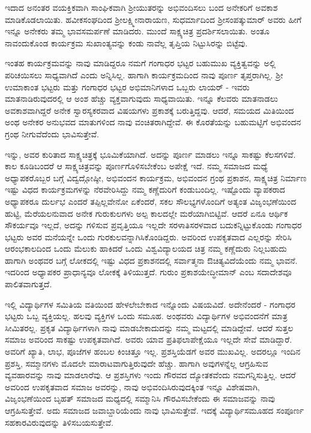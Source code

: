 {ಇದಾದ ಅನಂತರ ವಯಕ್ತಿಕವಾಗಿ ಸಾಂಘಿಕವಾಗಿ ಶ್ರೀಯುತರನ್ನು ಅಭಿವಂದಿಸಲು ಬಂದ ಅನೇಕರಿಗೆ ಅವಕಾಶ ಮಾಡಿಕೊಡಲಾಯಿತು. ಹವೀಕಸಂಘದಿಂದ ಶ್ರೀಲಕ್ಷ್ಮೀ\-ನಾರಾಯಣ, ಸುಧರ್ಮಾದಿಂದ ಶ್ರೀಸಂಪತ್ಕುಮಾರ್ ಅವರು ಹೀಗೆ ಇನ್ನೂ ಅನೇಕರು ತಮ್ಮ ಭಾವಸಮರ್ಪಣೆ ಮಾಡಿದರು. ಮುಂದೆ ಸಾಕ್ಷ್ಯಚಿತ್ರ ಪ್ರದರ್ಶಿಸಲಾಯಿತು. ಅಂತೂ ನಾವಂದುಕೊಂಡ ಕಾರ್ಯಕ್ರಮ ಸುಖಾಂತ್ಯವನ್ನು ಕಂಡು ನಾವೆಲ್ಲ ತೃಪ್ತಿಯ ನಿಟ್ಟುಸಿರನ್ನು ಬಿಟ್ಟೆವು.

ಇಂತಹ ಕಾರ್ಯಕ್ರಮವನ್ನು ನಾವು ಮಾಡಿದ್ದರೂ ನಮಗೆ  ಗಂಗಾಧರ ಭಟ್ಟರ ಬಹುಮುಖ ವ್ಯಕ್ತಿತ್ವವನ್ನು ಅಲ್ಲಿ ಪರಿಚಯಿಸಲು ಸಾಧ್ಯವಾಗಿದೆ ಎಂದು ಅನ್ನಿಸಿಲ್ಲ. ಹಾಗಾಗಿ ಕಾರ್ಯಕ್ರಮದಿಂದ ನಾವು ಪೂರ್ಣ ತೃಪ್ತರಾಗಿಲ್ಲ. ಶ್ರೀ ಉಮಾಕಾಂತ ಭಟ್ಟರು ಮತ್ತು  ಗಂಗಾಧರ ಭಟ್ಟರ ಅಭಿಮಾನಿಗಳಾದ ಒಬ್ಬರು ಲಾಯರ್  - ಇವರು ಮಾತನಾಡಿರುವುದರಲ್ಲಿ ಆ ಅಂಶ ಹೆಚ್ಚು ವ್ಯಕ್ತವಾಗುವುದು ಸಾಧ್ಯವಾಯಿತು. ಇನ್ನೂ ಕೆಲವರು ಮಾತನಾಡಲು ಅವಕಾಶವಾಗಿದ್ದರೆ ಅನೇಕ  ಸ್ವಾರಸ್ಯಕರವಾದ ವಿಷಯಗಳು ಪ್ರಕಾಶಕ್ಕೆ ಬರುತ್ತಿದ್ದವು. ಆದರೆ, ಸಮಯದ ಮಿತಿಯಿಂದ ಅಂಥ ಅನೇಕರ ಅನುಭವದ ಮಾತುಗಳಿಂದ ನಾವು ವಂಚಿತರಾಗಿದ್ದೇವೆ. ಈ ಕೊರತೆಯನ್ನು ಬಹುಮಟ್ಟಿಗೆ ಅಭಿವಂದನ ಗ್ರಂಥ ನೀಗುವೆದೆಂದು ಭಾವಿಸುತ್ತೇವೆ. 

ಇನ್ನು, ಅವರ ಕುರಿತಾದ ಸಾಕ್ಷ್ಯಚಿತ್ರಕ್ಕೆ ಭೂಮಿಕೆಯಾಗಿದೆ. ಅದನ್ನು ಪೂರ್ಣ ಮಾಡಲು ಇನ್ನೂ ಸಾಕಷ್ಟು ಕೆಲಸಗಳಿವೆ.  ಕಾಲ \hbox{ಕೂಡಿಬಂದರೆ} ಆ ಸಾಕ್ಷ್ಯಚಿತ್ರವನ್ನು \hbox{ಪೂರ್ಣಗೊಳಿಸಬೇಕೆಂಬ} ಅಪೇಕ್ಷೆ ಇದೆ.
ನಮ್ಮ ಸಮಾಜದ ಮಧ್ಯೆ  ಅಧ್ಯಾಪಕರೊಬ್ಬರ ಬಗ್ಗೆ  ವಿದ್ವದ್ಗೋಷ್ಠೀ, ಅಭಿವಂದನ ಕಾರ್ಯಕ್ರಮ, ಅಭಿವಂದನ ಗ್ರಂಥ ಪ್ರಕಾಶನ, \hbox{ಸಾಕ್ಷ್ಯಚಿತ್ರ} ನಿರ್ಮಾಣ ಇಷ್ಟು ವಿಧದ ಕಾರ್ಯಕ್ರಮಗಳನ್ನು  ನೆರವೇರಿಸಿದ್ದು ನಮ್ಮ ಕಣ್ಣೆದುರಿಗೆ ಕಂಡುಬಂದಿಲ್ಲ. ಇಷ್ಟೊಂದು ವ್ಯಾಪಕರಾದ \hbox{ಅಧ್ಯಾಪಕರೂ} ದುರ್ಲಭ ಎಂದರೆ ತಪ್ಪಿಲ್ಲವೇನೋ ಏಕೆಂದರೆ, ಸಕಲ \hbox{ಸೌಲಭ್ಯ}ಗಳೊಂದಿಗೆ ಅತ್ಯಂತ ವಿಜೃಂಭಣೆಯಿಂದ \hbox{ಹುಟ್ಟಿ,} ಮೆರೆಯಲನುವಾದ ಅನೇಕ ಗುರುಕುಲಗಳು ಅಲ್ಪ \hbox{ಕಾಲದಲ್ಲೇ} ಮರೆಯಾಗಿಬಿಟ್ಟಿವೆ. ಆದರೆ ಏನೂ ಆರ್ಥಿಕ ಸೌಕರ್ಯವೂ ಇಲ್ಲದೆ, ಅದನ್ನು ಗಳಿಸುವ ಪ್ರವೃತ್ತಿಯೂ ಇಲ್ಲದೇ  ಸರಳಾತಿಸರಳವಾದ ಬದುಕನ್ನಿಟ್ಟುಕೊಂಡು ಗಂಗಾಧರ ಭಟ್ಟರು ಅವರ ಮನೆಯನ್ನೇ ಒಂದು ಗುರಕುಲವನ್ನಾಗಿಸಿಕೊಂಡಿದ್ದರು. ಅವರಿಂದ ಉಪಕೃತವಾದ ಎಲ್ಲರನ್ನು  ಸೇರಿಸಿ ಆರಂಭಕಾಲದಿಂದ ಒಂದು ಮೆಲುಕು ಹಾಕಿದರೆ ಒಂದು ವಿಶ್ವವಿದ್ಯಾಲಯದ  ಚಿತ್ರ ನಮ್ಮ  ಕಣ್ಣೆದುರು ನಿಲ್ಲಬಹುದು ಹಾಗಾಗಿ ಅಂಥವರ ಬಗ್ಗೆ ಲೋಕದಲ್ಲಿ ಇಷ್ಟು ವಿಧದ ಪ್ರಕಾಶನದಲ್ಲಿ ಸರ್ವಾತ್ಮನಾ  ಔಚಿತ್ಯವಿದೆಯೆಂದು ನಮ್ಮ ಭಾವನೆ. ಇದರಿಂದ ಅಧ್ಯಾಪಕರ ಪ್ರಾಧಾನ್ಯವೂ ಲೋಕಕ್ಕೆ ತಿಳಿಯುತ್ತದೆ. ಗುರುಂ ಪ್ರಕಾಶಯೇದ್ಧೀಮಾನ್ ಎಂಬ ಸದಾದೇಶವೂ  \hbox{ಪಾಲಿತವಾಗುತ್ತದೆ.}
 
ಇಲ್ಲಿ ವಿದ್ಯಾರ್ಥಿಗಳ ಸಮಿತಿಯ ವತಿಯಿಂದ ಹೇಳಲೇಬೇಕಾದ ಇನ್ನೊಂದು \hbox{ವಿಷಯವಿದೆ.} ಅದೇನೆಂದರೆ - ಗಂಗಾಧರ ಭಟ್ಟರು ಒಬ್ಬ ವ್ಯಕ್ತಿಯಲ್ಲ. ಹಲವು ವ್ಯಕ್ತಿಗಳ ಒಂದು ಸಮೂಹ. ಅಂಥವರು ವಿದ್ಯಾರ್ಥಿಗಳ ಅಭಿವಂದನೆಗೆ ಮಾತ್ರ ಸೀಮಿತರಲ್ಲ. ಪ್ರಕೃತ \hbox{ವಿದ್ಯಾರ್ಥಿಗಳಾಗಿ} ನಾವು ಮಾಡಬೇಕಾದುದನ್ನು ನಮ್ಮ ಮಟ್ಟದಲ್ಲಿ ಮಾಡಿದ್ದೇವೆ. ಆದರೆ ಸುತ್ತಲ ಸಮಾಜ ಅವರಿಂದ ಸಾಕಷ್ಟು ಉಪಕೃತವಾಗಿದೆ. ಅವರು ಯಾವ ಪ್ರತಿಫಲಾಪೇಕ್ಷೆಯೂ ಇಲ್ಲದೇ ಸೇವೆ ಮಾಡಿದ್ದಾರೆ. ಅವರಿಗೆ ಖ್ಯಾತಿ, ಲಾಭ, ಪೂಜೆಗಳ ಹಂಬಲ ಕಿಂಚಿತ್ತೂ ಇಲ್ಲ. ಪ್ರಶಸ್ತಿಯೆಡಗೆ ಅವರ ಮುಖವಿಲ್ಲ. ಅದರಲ್ಲೂ ಇಂದಿನ ಪ್ರಶಸ್ತಿ, ಸಮ್ಮಾನಗಳು ಮೊದಲೇ ಮಾರಾಟವಾಗುತ್ತಿರುವುದೇ ಹೆಚ್ಚು. ಹಾಗಾಗಿ ಅವುಗಳನ್ನೆಲ್ಲ ಆಗ್ರಹಿಸುವ ವ್ಯವಹಾರವನ್ನು ನಾವು ಮಾಡಲಾರೆವು. ಆ ಪ್ರಶಸ್ತಿಗಳು ಇಂದು ಗೌರವದ \hbox{ದ್ಯೋತಕವೆಂದು} ನಮಗನ್ನಿಸುತ್ತಿಲ್ಲ. ಆದರೆ ಅವರಿಂದ ಉಪಕೃತವಾದ ಸಮಾಜ ಅವರನ್ನು, ನಾವು ಅಭಿವಂದಿಸಿರುವುದಕ್ಕಿಂತ ಇನ್ನೂ ವಿಶೇಷವಾಗಿ, ವಿಜೃಂಭಣೆಯಿಂದ ಬೃಹತ್ ಸಮಾಜದ ಮಧ್ಯದಲ್ಲಿ ಸಮ್ಮಾನಿಸಿ ಗೌರವಿಸಬೇಕೆಂದು ಈ \hbox{ಸಮಾಜವನ್ನು} ನಾವು ಆಗ್ರಹಿಸುತ್ತೇವೆ. ಅದು ಸಮಾಜದ ಜವಾಬ್ದಾರಿಯೆಂದು ನಾವು ಭಾವಿಸುತ್ತೇವೆ. ಇದಕ್ಕೆ  ವಿದ್ಯಾರ್ಥಿಸಮೂಹದ ಸಂಪೂರ್ಣ \hbox{ಸಹಕಾರವಿರುವುದನ್ನು} ತಿಳಿಸಬಯಸುತ್ತೇವೆ.

}
